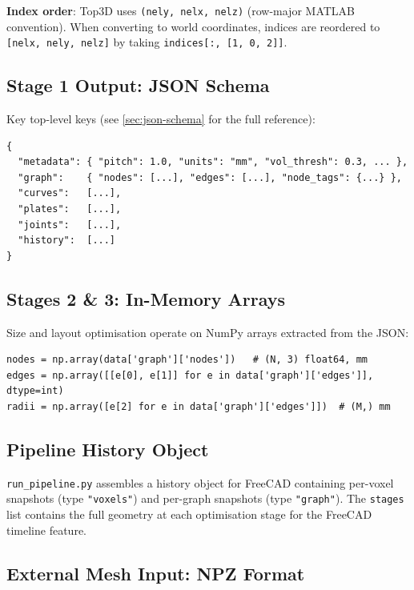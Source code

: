 \documentclass[a4paper, 11pt, openany]{report}
\begin{document}
\textbf{Index order}: Top3D uses \texttt{(nely, nelx, nelz)} (row-major MATLAB
convention).  When converting to world coordinates, indices are reordered to
\texttt{[nelx, nely, nelz]} by taking \texttt{indices[:, [1, 0, 2]]}.


\subsection{Stage 1 Output: JSON Schema}

Key top-level keys (see \cref{sec:json-schema} for the full reference):

\begin{lstlisting}[style=textstyle]
{
  "metadata": { "pitch": 1.0, "units": "mm", "vol_thresh": 0.3, ... },
  "graph":    { "nodes": [...], "edges": [...], "node_tags": {...} },
  "curves":   [...],
  "plates":   [...],
  "joints":   [...],
  "history":  [...]
}
\end{lstlisting}


\subsection{Stages 2 \texorpdfstring{\&}{and} 3: In-Memory Arrays}

Size and layout optimisation operate on NumPy arrays extracted from the JSON:

\begin{lstlisting}[style=pythonstyle]
nodes = np.array(data['graph']['nodes'])   # (N, 3) float64, mm
edges = np.array([[e[0], e[1]] for e in data['graph']['edges']], dtype=int)
radii = np.array([e[2] for e in data['graph']['edges']])  # (M,) mm
\end{lstlisting}


\subsection{Pipeline History Object}

\texttt{run\_pipeline.py} assembles a history object for FreeCAD containing
per-voxel snapshots (type \texttt{"voxels"}) and per-graph snapshots (type
\texttt{"graph"}).  The \texttt{stages} list contains the full geometry at each
optimisation stage for the FreeCAD timeline feature.


\subsection{External Mesh Input: NPZ Format}
\end{document}
